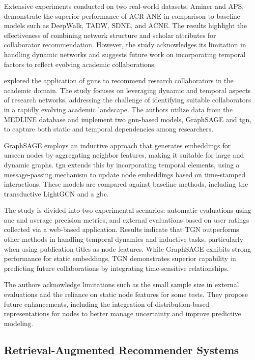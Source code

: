 Extensive experiments conducted on two real-world datasets, Aminer and APS, demonstrate the superior performance of ACR-ANE in comparison to baseline models such as DeepWalk, TADW, SDNE, and ACNE.
The results highlight the effectiveness of combining network structure and scholar attributes for collaborator recommendation.
However, the study acknowledges its limitation in handling dynamic networks and suggests future work on incorporating temporal factors to reflect evolving academic collaborations.


\cite{Zhu2022} explored the application of \glspl{gnn} to recommend research collaborators in the academic domain.
The study focuses on leveraging dynamic and temporal aspects of research networks, addressing the challenge of identifying suitable collaborators in a rapidly evolving academic landscape.
The authors utilize data from the MEDLINE database and implement two \gls{gnn}-based models, GraphSAGE and \gls{tgn}, to capture both static and temporal dependencies among researchers.

GraphSAGE employs an inductive approach that generates embeddings for unseen nodes by aggregating neighbor features, making it suitable for large and dynamic graphs.
\gls{tgn} extends this by incorporating temporal elements, using a message-passing mechanism to update node embeddings based on time-stamped interactions.
These models are compared against baseline methods, including the transductive LightGCN and a \gls{gbc}.

The study is divided into two experimental scenarios: automatic evaluations using \gls{auc} and average precision metrics, and external evaluations based on user ratings collected via a web-based application.
Results indicate that TGN outperforms other methods in handling temporal dynamics and inductive tasks, particularly when using publication titles as node features. While GraphSAGE exhibits strong performance for static embeddings, TGN demonstrates superior capability in predicting future collaborations by integrating time-sensitive relationships.

The authors acknowledge limitations such as the small sample size in external evaluations and the reliance on static node features for some tests.
They propose future enhancements, including the integration of distribution-based representations for nodes to better manage uncertainty and improve predictive modeling.

\subsection*{Retrieval-Augmented Recommender Systems}\label{sec:retrieval-augmented-recommender-systems-in-research-field}

